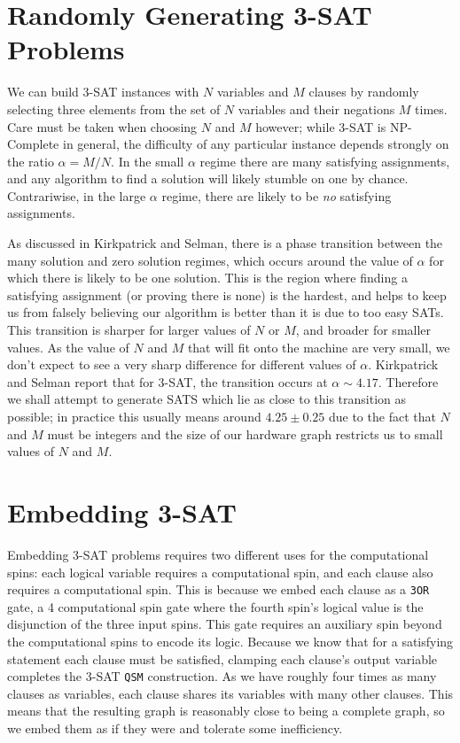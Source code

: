 \section{Randomly Generating 3-SAT Problems}
We can build 3-SAT instances with $N$ variables and $M$ clauses by randomly selecting three elements from the set of $N$ variables and their negations $M$ times.  Care must be taken when choosing $N$ and $M$ however; while 3-SAT is NP-Complete in general, the difficulty of any particular instance depends strongly on the ratio $\alpha = M/N$\cite{Kirkpatrick}.  In the small $\alpha$ regime there are many satisfying assignments, and any algorithm to find a solution will likely stumble on one by chance.  Contrariwise, in the large $\alpha$ regime, there are likely to be \emph{no} satisfying assignments.

As discussed in Kirkpatrick and Selman\cite{Kirkpatrick}, there is a phase transition between the many solution and zero solution regimes, which occurs around the value of $\alpha$ for which there is likely to be one solution.  This is the region where finding a satisfying assignment (or proving there is none) is the hardest, and helps to keep us from falsely believing our algorithm is better than it is due to too easy SATs.  This transition is sharper for larger values of $N$ or $M$, and broader for smaller values.  As the value of $N$ and $M$ that will fit onto the \machine machine are very small, we don't expect to see a very sharp difference for different values of $\alpha$.  Kirkpatrick and Selman report that for 3-SAT, the transition occurs at $\alpha \sim 4.17$.  Therefore we shall attempt to generate SATS which lie as close to this transition as possible; in practice this usually means around $4.25 \pm 0.25$ due to the fact that $N$ and $M$ must be integers and the size of our hardware graph restricts us to small values of $N$ and $M$.

\section{Embedding 3-SAT}
Embedding 3-SAT problems requires two different uses for the computational spins: each logical variable requires a computational spin, and each clause also requires a computational spin.  This is because we embed each clause as a \texttt{3OR} gate, a 4 computational spin gate where the fourth spin's logical value is the disjunction of the three input spins.  This gate requires an auxiliary spin beyond the computational spins to encode its logic.  Because we know that for a satisfying statement each clause must be satisfied, clamping each clause's output variable completes the 3-SAT \texttt{QSM} construction.  As we have roughly four times as many clauses as variables, each clause shares its variables with many other clauses.  This means that the resulting graph is reasonably close to being a complete graph, so we embed them as if they were and tolerate some inefficiency. 

